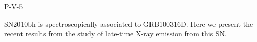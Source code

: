 P-V-5


\bigskip



\bigskip

\noindent SN2010bh is spectroscopically associated to GRB100316D. Here we present the recent results from the study of late-time X-ray emission from this SN.
